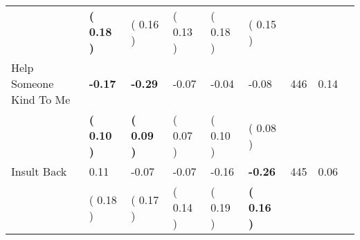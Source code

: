 \begin{tabular}{L{6.2cm} C{1.8cm} C{1.8cm} C{1.8cm} C{1.8cm} C{1.8cm} C{1.8cm} C{0.3cm} C{0.3cm}}
 & \textbf{(     0.18 )} & (     0.16 ) & (     0.13 ) & (     0.18 ) & (     0.15 )  & \\
Help Someone Kind To Me & \textbf{    -0.17} & \textbf{    -0.29} &     -0.07 &     -0.04 &     -0.08  & 446 &       0.14 \\ 
 & \textbf{(     0.10 )} & \textbf{(     0.09 )} & (     0.07 ) & (     0.10 ) & (     0.08 )  & \\
Insult Back &      0.11 &     -0.07 &     -0.07 &     -0.16 & \textbf{    -0.26}  & 445 &       0.06 \\ 
 & (     0.18 ) & (     0.17 ) & (     0.14 ) & (     0.19 ) & \textbf{(     0.16 )}  & \\
\bottomrule
\end{tabular}
